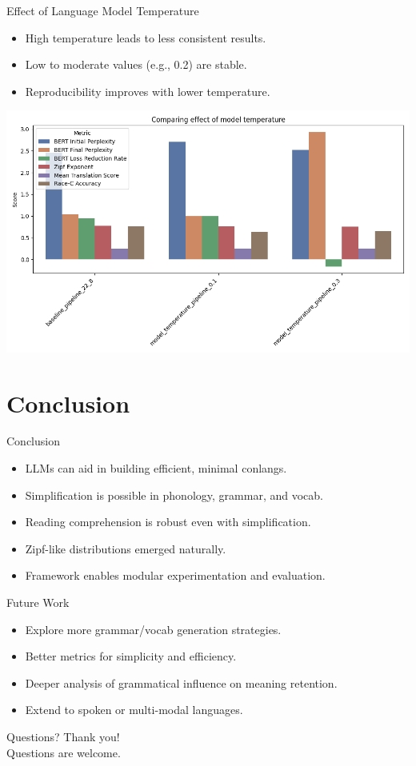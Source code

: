 \documentclass{beamer}
\begin{document}
\begin{frame}{Effect of Language Model Temperature}
	\begin{itemize}
		\item High temperature leads to less consistent results.
		\item Low to moderate values (e.g., 0.2) are stable.
		\item Reproducibility improves with lower temperature.
	\end{itemize}
	\includegraphics[width=0.7\linewidth]{figures/results/1_effect_of_model_temperature.png}
\end{frame}

\section{Conclusion}

\begin{frame}{Conclusion}
	\begin{itemize}
		\item LLMs can aid in building efficient, minimal conlangs.
		\item Simplification is possible in phonology, grammar, and vocab.
		\item Reading comprehension is robust even with simplification.
		\item Zipf-like distributions emerged naturally.
		\item Framework enables modular experimentation and evaluation.
	\end{itemize}
\end{frame}

\begin{frame}{Future Work}
	\begin{itemize}
		\item Explore more grammar/vocab generation strategies.
		\item Better metrics for simplicity and efficiency.
		\item Deeper analysis of grammatical influence on meaning retention.
		\item Extend to spoken or multi-modal languages.
	\end{itemize}
\end{frame}

\begin{frame}{Questions?}
	\centering
	Thank you!\\
	Questions are welcome.
\end{frame}
\end{document}
